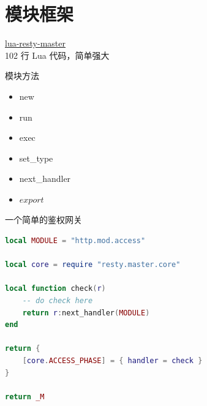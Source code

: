 \documentclass[aspectratio=32]{beamer}
\begin{document}
\begin{frame}[standout]
\end{frame}

\section{模块框架}

\begin{frame}[standout]
\end{frame}

\begin{frame}
\begin{center}
\alert{\href{https://github.com/openresty-fan/lua-resty-master}{lua-resty-master}}\\[1.5em]
102 行 Lua 代码，简单强大
\end{center}
\end{frame}

\begin{frame}{模块方法}
\begin{itemize}
  \item new
  \item run
  \item exec
  \item set\_type
  \item next\_handler
  \item \alert{$export$}
\end{itemize}
\end{frame}

\begin{frame}[fragile]{一个简单的鉴权网关}
\small
\begin{lstlisting}[language=lua]
local MODULE = "http.mod.access"

local core = require "resty.master.core"

local function check(r)
    -- do check here
    return r:next_handler(MODULE)
end

return {
    [core.ACCESS_PHASE] = { handler = check }
}

return _M
\end{lstlisting}
\end{frame}
\end{document}

